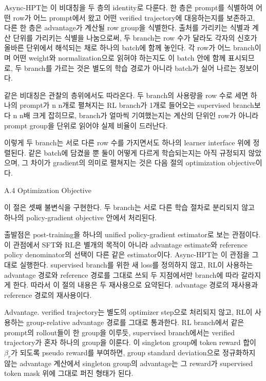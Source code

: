 Async-HPT는 이 비대칭을 두 층의 identity로 다룬다. 한 층은 prompt를 식별하여 어떤 row가 어느 prompt에서 왔고 어떤 verified trajectory에 대응하는지를 보존하고, 다른 한 층은 advantage가 계산될 row group을 식별한다. 출처를 가리키는 식별과 계산 단위를 가리키는 식별을 나눔으로써, 두 branch는 row 수가 달라도 각자의 신호가 올바른 단위에서 해석되는 채로 하나의 batch에 함께 놓인다. 각 row가 어느 branch이며 어떤 weight와 normalization으로 읽혀야 하는지도 이 batch 안에 함께 표시되므로, 두 branch를 가르는 것은 별도의 학습 경로가 아니라 batch가 실어 나르는 정보이다.

같은 비대칭은 관찰의 층위에서도 따라온다. 두 branch의 사용량을 row 수로 세면 하나의 prompt가 
n
n개로 펼쳐지는 RL branch가 1개로 들어오는 supervised branch보다 
n
n배 크게 잡히므로, branch가 얼마씩 기여했는지는 계산의 단위인 row가 아니라 prompt group을 단위로 읽어야 실제 비율이 드러난다.

이렇게 두 branch는 서로 다른 row 수를 가지면서도 하나의 learner interface 위에 정렬된다. 같은 batch에 담겼을 뿐 둘이 어떻게 다르게 학습되는지는 아직 규정되지 않았으며, 그 차이가 gradient의 의미로 펼쳐지는 것은 다음 절의 optimization objective이다.



A.4 Optimization Objective


이 절은 셋째 불변식을 구현한다. 두 branch는 서로 다른 학습 절차로 분리되지 않고 하나의 policy-gradient objective 안에서 처리된다.

출발점은 post-training을 하나의 unified policy-gradient estimator로 보는 관점이다. 이 관점에서 SFT와 RL은 별개의 목적이 아니라 advantage estimate와 reference policy denominator의 선택이 다른 같은 estimator이다. Async-HPT는 이 관점을 그대로 실행한다. supervised branch를 위한 새 loss를 정의하지 않고, RL이 사용하는 advantage 경로와 reference 경로를 그대로 쓰되 두 지점에서만 branch에 따라 갈라지게 한다. 따라서 이 절의 내용은 두 재사용으로 요약된다. advantage 경로의 재사용과 reference 경로의 재사용이다.

Advantage. verified trajectory는 별도의 optimizer step으로 처리되지 않고, RL이 사용하는 group-relative advantage 경로를 그대로 통과한다. RL branch에서 같은 prompt의 rollout들이 한 group을 이루듯, supervised branch에서는 verified trajectory가 혼자 하나의 group을 이룬다. 이 singleton group에 token reward 합이 $\beta_r$가 되도록 pseudo reward를 부여하면, group standard deviation으로 정규화하지 않는 advantage 계산에서 singleton group의 advantage는 그 reward가 supervised token mask 위에 그대로 퍼진 형태가 된다.

